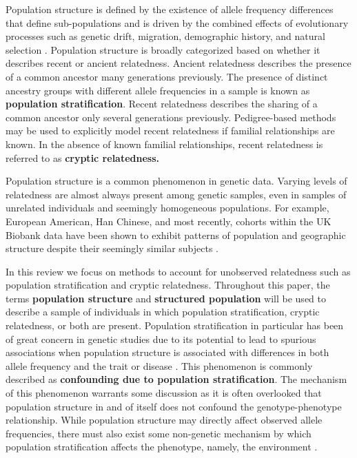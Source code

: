 Population structure is defined by the existence of allele frequency differences that define sub-populations and is driven by the combined effects of evolutionary processes such as genetic drift, migration, demographic history, and natural selection \citep{gibson2015primer, tibayrenc2017genetics}. Population structure is broadly categorized based on whether it describes recent or ancient relatedness. Ancient relatedness describes the presence of a common ancestor many generations previously. The presence of distinct ancestry groups with different allele frequencies in a sample is known as \textbf{population stratification}. Recent relatedness describes the sharing of a common ancestor only several generations previously. Pedigree-based methods may be used to explicitly model recent relatedness if familial relationships are known. In the absence of known familial relationships, recent relatedness is referred to as \textbf{cryptic relatedness.} 

Population structure is a common phenomenon in genetic data. Varying levels of relatedness are almost always present among genetic samples, even in samples of unrelated individuals and seemingly homogeneous populations. For example, European American, Han Chinese, and most recently, cohorts within the UK Biobank data have been shown to exhibit patterns of population and geographic structure despite their seemingly similar subjects \citep{campbell2005demonstrating, xu2009genomic, chen2009genetic, haworth2019apparent}.

In this review we focus on methods to account for unobserved relatedness such as population stratification and cryptic relatedness. Throughout this paper, the terms \textbf{population structure} and \textbf{structured population} will be used to describe a sample of individuals in which population stratification, cryptic relatedness, or both are present. Population stratification in particular has been of great concern in genetic studies due to its potential to lead to spurious associations when population structure is associated with differences in both allele frequency and the trait or disease \citep{gibson2015primer}. This phenomenon is commonly described as \textbf{confounding due to population stratification}. The mechanism of this phenomenon warrants some discussion as it is often overlooked that population structure in and of itself does not confound the genotype-phenotype relationship. While population structure may directly affect observed allele frequencies, there must also exist some non-genetic mechanism by which population stratification affects the phenotype, namely, the environment \citep{barton2019population, vilhjalmsson2012nature}.


